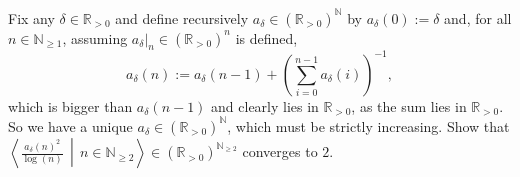 \begin{problem}
    Fix any \( \delta \in \mathbb{R}_{>0} \) and define recursively \( a_\delta \in \left(\mathbb{R}_{>0}\right)^{\mathbb{N}} \) by \( a_\delta\left(0\right) := \delta \) and, for all \( n \in \mathbb{N}_{\geq 1} \), assuming \( a_\delta|_n \in \left(\mathbb{R}_{>0}\right)^n \) is defined,
    \[
        a_\delta\left(n\right) := a_\delta\left(n-1\right)+\left(\sum_{i=0}^{n-1} a_\delta\left(i\right)\right)^{-1},
    \]
    which is bigger than \( a_\delta\left(n-1\right) \) and clearly lies in \( \mathbb{R}_{>0} \), as the sum lies in \( \mathbb{R}_{>0} \). So we have a unique \( a_\delta \in \left(\mathbb{R}_{>0}\right)^{\mathbb{N}} \), which must be strictly increasing. Show that \( \left\langle \frac{a_\delta\left(n\right)^2}{\log\left(n\right)} \,\middle|\, n \in \mathbb{N}_{\geq 2} \right\rangle \in \left(\mathbb{R}_{>0}\right)^{\mathbb{N}_{\geq 2}} \) converges to \( 2 \).
\end{problem}
